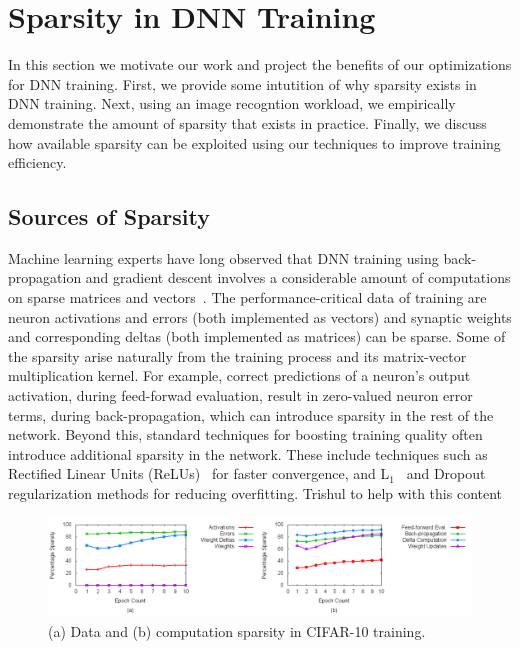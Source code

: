 \section{Sparsity in DNN Training}
 \label{sec:sparse_dnn_training}
 
 In this section we motivate our work and project the benefits of our optimizations for DNN training.  First, we provide some intutition of why sparsity exists in DNN training.  Next, using an image recogntion workload, we empirically demonstrate the amount of sparsity that exists in practice.  Finally, we discuss how available sparsity can be exploited using our techniques to improve training efficiency. 
 
\subsection{Sources of Sparsity}
\label{subsec:sparsity_source}

Machine learning experts have long observed that DNN training using back-propagation and gradient descent involves a considerable amount of computations on sparse matrices and vectors~\cite{Ng04, Nair10, Krizhevsky12, Bengio13, Srivastava14a}.  The performance-critical data of training are neuron activations and errors (both implemented as vectors) and synaptic weights and corresponding deltas (both implemented as matrices) can be sparse.  Some of the sparsity arise naturally from the training process and its matrix-vector multiplication kernel.  For example, correct predictions of a neuron's output activation, during feed-forwad evaluation, result in zero-valued neuron error terms, during back-propagation, which can introduce sparsity in the rest of the network.  Beyond this, standard techniques for boosting training quality often introduce additional sparsity in the network.  These include techniques such as Rectified Linear Units (ReLUs)~\cite{Nair10, Krizhevsky12} for faster convergence, and  L$_1$~\cite{Ng04, Bengio13} and Dropout~\cite{Srivastava14a} regularization methods for reducing overfitting.  {\color{red} Trishul to help with this content}
 
\begin{figure}
 \centering
 \includegraphics[width=1.9\columnwidth]{Figures/cifar-10_word_sparsity.png}
\caption{(a) Data and (b) computation sparsity in CIFAR-10 training.}
 \label{fig:cifar-10_word_sparsity}
 \end{figure}

